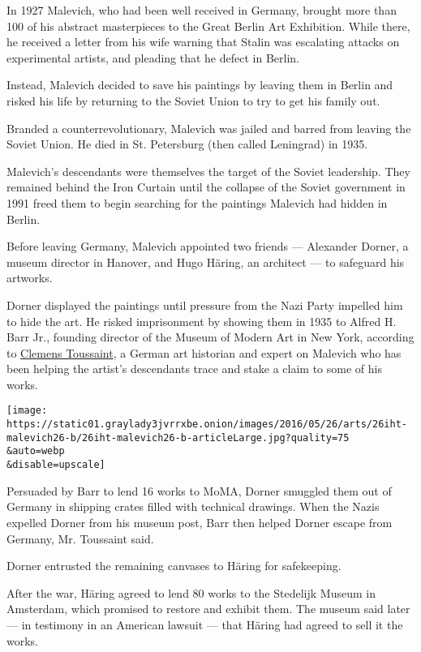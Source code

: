 In 1927 Malevich, who had been well received in Germany, brought more
than 100 of his abstract masterpieces to the Great Berlin Art
Exhibition. While there, he received a letter from his wife warning that
Stalin was escalating attacks on experimental artists, and pleading that
he defect in Berlin.

Instead, Malevich decided to save his paintings by leaving them in
Berlin and risked his life by returning to the Soviet Union to try to
get his family out.

Branded a counterrevolutionary, Malevich was jailed and barred from
leaving the Soviet Union. He died in St. Petersburg (then called
Leningrad) in 1935.

Malevich's descendants were themselves the target of the Soviet
leadership. They remained behind the Iron Curtain until the collapse of
the Soviet government in 1991 freed them to begin searching for the
paintings Malevich had hidden in Berlin.

Before leaving Germany, Malevich appointed two friends --- Alexander
Dorner, a museum director in Hanover, and Hugo Häring, an architect ---
to safeguard his artworks.

Dorner displayed the paintings until pressure from the Nazi Party
impelled him to hide the art. He risked imprisonment by showing them in
1935 to Alfred H. Barr Jr., founding director of the Museum of Modern
Art in New York, according to
\href{http://www.nytimes3xbfgragh.onion/2006/03/26/arts/design/26ridi.html?pagewanted=all\&_r=0}{Clemens
Toussaint}, a German art historian and expert on Malevich who has been
helping the artist's descendants trace and stake a claim to some of his
works.

\texttt{[image: https://static01.graylady3jvrrxbe.onion/images/2016/05/26/arts/26iht-malevich26-b/26iht-malevich26-b-articleLarge.jpg?quality=75\\\&auto=webp\\\&disable=upscale]}

Persuaded by Barr to lend 16 works to MoMA, Dorner smuggled them out of
Germany in shipping crates filled with technical drawings. When the
Nazis expelled Dorner from his museum post, Barr then helped Dorner
escape from Germany, Mr. Toussaint said.

Dorner entrusted the remaining canvases to Häring for safekeeping.

After the war, Häring agreed to lend 80 works to the Stedelijk Museum in
Amsterdam, which promised to restore and exhibit them. The museum said
later --- in testimony in an American lawsuit --- that Häring had agreed
to sell it the works.

